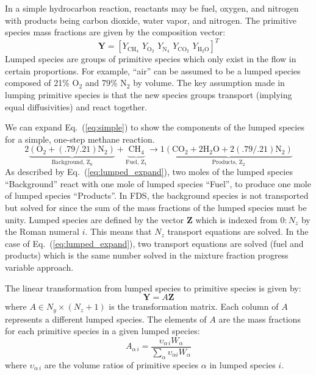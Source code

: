 In a simple hydrocarbon reaction, reactants may be fuel, oxygen, and nitrogen with products being carbon dioxide, water vapor, and nitrogen. The primitive species mass fractions are given by the composition vector:
\begin{equation}\label{eq:prim_vector}
\mathbf{Y} = [Y_{\mathrm{CH}_4}\, \, Y_{\mathrm{O}_2}\, \, Y_{\mathrm{N}_4}\, \, Y_{\mathrm{CO}_2}\, \, Y_{\mathrm{H}_2\mathrm{O}}]^T
\end{equation}
Lumped species are groups of primitive species which only exist in the flow in certain proportions. For example, ``air'' can be assumed to be a lumped species composed of 21\% O$_2$ and 79\% N$_2$ by volume. The key assumption made in lumping primitive species is that the new species groups transport (implying equal diffusivities) and react together. 

We can expand Eq.~(\ref{eq:simple}) to show the components of the lumped species for a simple, one-step methane reaction. 
\begin{equation}\label{eq:lumped_expand}
\mathrm{2\underbrace{(\mbox{O}_2+(.79/.21)\mbox{N}_2)}_\text{Background,~$Z_0$}+\underbrace{\mbox{CH}_4}_\text{Fuel,~$Z_1$} \rightarrow 1\underbrace{(\mbox{CO}_2+2\mbox{H}_2\mbox{O}+2(.79/.21)\mbox{N}_2)}_\text{Products,~$Z_2$}}
\end{equation}
As described by Eq.~(\ref{eq:lumped_expand}), two moles of the lumped species ``Background'' react with one mole of lumped species ``Fuel'', to produce one mole of lumped species ``Products''. In FDS, the background species is not transported but solved for since the sum of the mass fractions of the lumped species must be unity. Lumped species are defined by the vector $\textbf{Z}$ which is indexed from $0:N_{z}$ by the Roman numeral $i$. This means that $N_{z}$ transport equations are solved. In the case of Eq.~(\ref{eq:lumped_expand}), two transport equations are solved (fuel and products) which is the same number solved in the mixture fraction progress variable approach.

The linear transformation from lumped species to primitive species is given by: 
\begin{equation}\label{eq:transform}
\textbf{Y}=A\textbf{Z} 
\end{equation}
where $A \in N_{y} \times (N_{z}+1)$ is the transformation matrix.  Each column of $A$ represents a different lumped species.  The elements of $A$ are the mass fractions for each primitive species in a given lumped species:
\begin{equation}\label{eq:A_def}
A_{\alpha\,i} = \frac{\upsilon_{\alpha\,i}W_{\alpha}}{\displaystyle \sum_{\alpha}\upsilon_{\alpha i}W_{\alpha}}
\end{equation}
where $\upsilon_{\alpha\,i}$ are the volume ratios of primitive species $\alpha$ in lumped species $i$.

